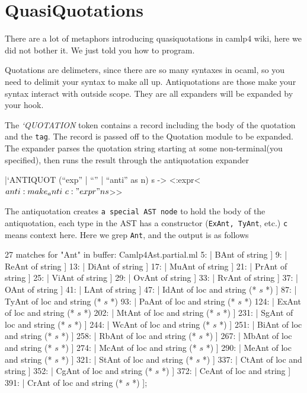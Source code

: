 \section{QuasiQuotations}


There are a lot of metaphors introducing quasiquotations in camlp4
wiki, here we did not bother it. We just told you how to program.

Quotations are delimeters, since there are so many syntaxes in ocaml,
so you need to delimit your syntax to make all up. Antiquotations are
those make your syntax interact with outside scope. They are all
expanders will be expanded by your hook.

\begin{ocamlcode}
\end{ocamlcode}

The \textit{`QUOTATION} token contains a record including the body of
the quotation and the \verb|tag|. The record is passed off to the
Quotation module to be expanded. The expander parses the quotation
string starting at some non-terminal(you specified), then runs the
result through the antiquotation expander

\begin{ocamlcode}
  |`ANTIQUOT (``exp'' | ``'' | ``anti'' as n) s ->
  <:expr< $anti:make_anti ~c:"expr" n s $>>
\end{ocamlcode}

The antiquotation creates \verb|a special AST node| to hold the body of the
antiquotation, each type in the AST has a constructor (\verb|ExAnt, TyAnt|,
etc.) \verb|c|  means context here.
Here we grep \verb|Ant|, and the output is as follows

\begin{bluetext}
  27 matches for "Ant" in buffer: Camlp4Ast.partial.ml
      5:    | BAnt of string ]
      9:    | ReAnt of string ]
     13:    | DiAnt of string ]
     17:    | MuAnt of string ]
     21:    | PrAnt of string ]
     25:    | ViAnt of string ]
     29:    | OvAnt of string ]
     33:    | RvAnt of string ]
     37:    | OAnt of string ]
     41:    | LAnt of string ]
     47:    | IdAnt of loc and string (* $s$ *) ]
     87:    | TyAnt of loc and string (* $s$ *)
     93:    | PaAnt of loc and string (* $s$ *)
    124:    | ExAnt of loc and string (* $s$ *)
    202:    | MtAnt of loc and string (* $s$ *) ]
    231:    | SgAnt of loc and string (* $s$ *) ]
    244:    | WcAnt of loc and string (* $s$ *) ]
    251:    | BiAnt of loc and string (* $s$ *) ]
    258:    | RbAnt of loc and string (* $s$ *) ]
    267:    | MbAnt of loc and string (* $s$ *) ]
    274:    | McAnt of loc and string (* $s$ *) ]
    290:    | MeAnt of loc and string (* $s$ *) ]
    321:    | StAnt of loc and string (* $s$ *) ]
    337:    | CtAnt of loc and string ]
    352:    | CgAnt of loc and string (* $s$ *) ]
    372:    | CeAnt of loc and string ]
    391:    | CrAnt of loc and string (* $s$ *) ];
\end{bluetext}

